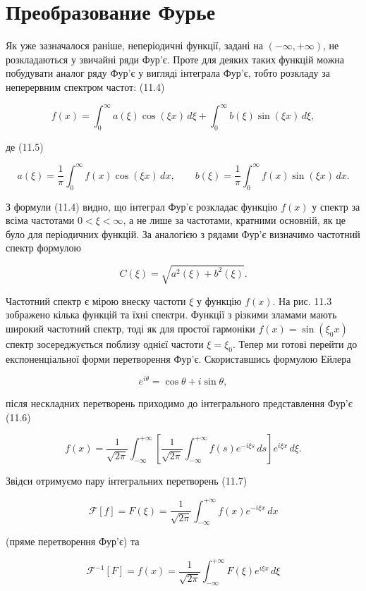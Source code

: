 \section{Преобразование Фурье}\label{ux43fux440ux435ux43eux431ux440ux430ux437ux43eux432ux430ux43dux438ux435-ux444ux443ux440ux44cux435}

Як уже зазначалося раніше, неперіодичні функції, задані на \((-\infty,+\infty)\), не розкладаються у звичайні ряди Фур'є. Проте для деяких таких функцій можна побудувати аналог ряду Фур'є у вигляді інтеграла Фур'є, тобто розкладу за неперервним спектром частот: (11.4)

\[
f(x) = \int_{0}^{\infty} a(\xi)\cos(\xi x)\,d\xi + \int_{0}^{\infty} b(\xi)\sin(\xi x)\,d\xi,
\]

де (11.5)

\[
a(\xi) = \frac{1}{\pi}\int_{0}^{\infty} f(x)\cos(\xi x)\,dx, \qquad
b(\xi) = \frac{1}{\pi}\int_{0}^{\infty} f(x)\sin(\xi x)\,dx.
\]

З формули (11.4) видно, що інтеграл Фур'є розкладає функцію \(f(x)\) у спектр за всіма частотами \(0<\xi<\infty\), а не лише за частотами, кратними основній, як це було для періодичних функцій. За аналогією з рядами Фур'є визначимо частотний спектр формулою

\[
C(\xi) = \sqrt{a^2(\xi) + b^2(\xi)}.
\]

Частотний спектр є мірою внеску частоти \(\xi\) у функцію \(f(x)\). На рис. 11.3 зображено кілька функцій та їхні спектри. Функції з різкими зламами мають широкий частотний спектр, тоді як для простої гармоніки \(f(x)=\sin(\xi_0 x)\) спектр зосереджується поблизу однієї частоти \(\xi=\xi_0\). Тепер ми готові перейти до експоненціальної форми перетворення Фур'є. Скориставшись формулою Ейлера

\[
e^{i\theta} = \cos\theta + i\sin\theta,
\]

після нескладних перетворень приходимо до інтегрального представлення Фур'є (11.6)

\[
f(x) = \frac{1}{\sqrt{2\pi}} \int_{-\infty}^{+\infty}
\left[\frac{1}{\sqrt{2\pi}} \int_{-\infty}^{+\infty} f(s)e^{-i\xi s}\,ds \right]
e^{i\xi x}\,d\xi.
\]

Звідси отримуємо пару інтегральних перетворень (11.7)

\[
\mathcal{F}[f] = F(\xi) = \frac{1}{\sqrt{2\pi}} \int_{-\infty}^{+\infty} f(x)e^{-i\xi x}\,dx
\]

(пряме перетворення Фур'є) та

\[
\mathcal{F}^{-1}[F] = f(x) = \frac{1}{\sqrt{2\pi}} \int_{-\infty}^{+\infty} F(\xi)e^{i\xi x}\,d\xi
\]

